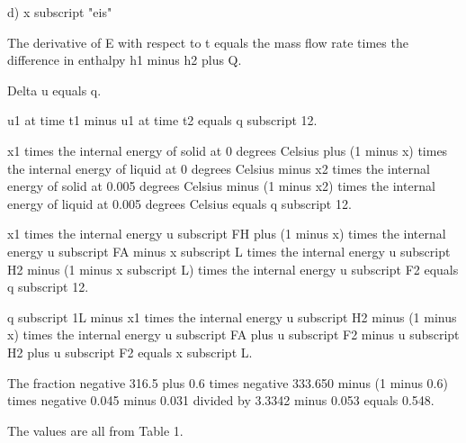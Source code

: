 d) x subscript "eis"

The derivative of E with respect to t equals the mass flow rate times the difference in enthalpy h1 minus h2 plus Q.

Delta u equals q.

u1 at time t1 minus u1 at time t2 equals q subscript 12.

x1 times the internal energy of solid at 0 degrees Celsius plus (1 minus x) times the internal energy of liquid at 0 degrees Celsius minus x2 times the internal energy of solid at 0.005 degrees Celsius minus (1 minus x2) times the internal energy of liquid at 0.005 degrees Celsius equals q subscript 12.

x1 times the internal energy u subscript FH plus (1 minus x) times the internal energy u subscript FA minus x subscript L times the internal energy u subscript H2 minus (1 minus x subscript L) times the internal energy u subscript F2 equals q subscript 12.

q subscript 1L minus x1 times the internal energy u subscript H2 minus (1 minus x) times the internal energy u subscript FA plus u subscript F2 minus u subscript H2 plus u subscript F2 equals x subscript L.

The fraction negative 316.5 plus 0.6 times negative 333.650 minus (1 minus 0.6) times negative 0.045 minus 0.031 divided by 3.3342 minus 0.053 equals 0.548.

The values are all from Table 1.